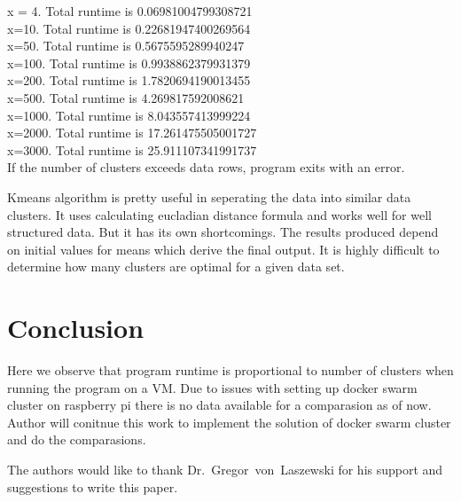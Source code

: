 x = 4. Total runtime is  0.06981004799308721\\
x=10. Total runtime is  0.22681947400269564\\
x=50. Total runtime is  0.5675595289940247\\
x=100. Total runtime is  0.9938862379931379\\
x=200. Total runtime is  1.7820694190013455\\
x=500. Total runtime is  4.269817592008621\\
x=1000. Total runtime is  8.043557413999224\\
x=2000. Total runtime is  17.261475505001727\\
x=3000. Total runtime is  25.911107341991737\\

If the number of clusters exceeds data rows, program exits with an
error. 

Kmeans algorithm is pretty useful in seperating the data into similar
data clusters. It uses calculating eucladian distance formula and
works well for well structured data. But it has its own
shortcomings. The results produced depend on initial values for means
which derive the final output. It is highly difficult to determine how
many clusters are optimal for a given data set.

\section{Conclusion}

Here we observe that program runtime is proportional to number of
clusters when running the program on a VM. Due to issues with setting
up docker swarm cluster on raspberry pi there is no data available for
a comparasion as of now. Author will conitnue this work to implement
the solution of docker swarm cluster and do the comparasions.


\begin{acks}

  The authors would like to thank Dr.~Gregor~von~Laszewski for his
  support and suggestions to write this paper.

\end{acks}


 

